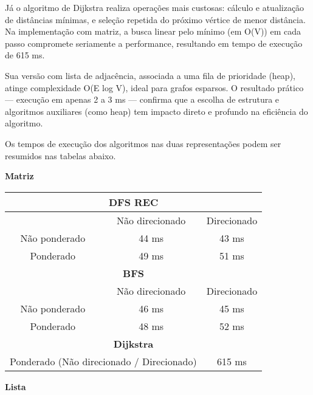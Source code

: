 \documentclass{sbc2023}%
\begin{document}
 Já o algoritmo de Dijkstra realiza operações mais custosas: cálculo e atualização de distâncias mínimas, e seleção repetida do próximo vértice de menor distância. Na implementação com matriz, a busca linear pelo mínimo (em O(V)) em cada passo compromete seriamente a performance, resultando em tempo de execução de 615 ms.

Sua versão com lista de adjacência, associada a uma fila de prioridade (heap), atinge complexidade O(E log V), ideal para grafos esparsos. O resultado prático — execução em apenas 2 a 3 ms — confirma que a escolha de estrutura e algoritmos auxiliares (como heap) tem impacto direto e profundo na eficiência do algoritmo.

Os tempos de execução dos algoritmos nas duas representações podem ser resumidos nas tabelas abaixo.

\begin{center}
\textbf{Matriz}
\end{center}

\begin{center}
\begin{tabular}{|c|c|c|}
\hline
\multicolumn{3}{|c|}{\textbf{DFS REC}} \\
\hline
 & Não direcionado & Direcionado \\
\hline
Não ponderado & 44 ms & 43 ms \\
Ponderado     & 49 ms & 51 ms \\
\hline
\multicolumn{3}{|c|}{\textbf{BFS}} \\
\hline
 & Não direcionado & Direcionado \\
\hline
Não ponderado & 46 ms & 45 ms \\
Ponderado     & 48 ms & 52 ms \\
\hline
\multicolumn{3}{|c|}{\textbf{Dijkstra}} \\
\hline
\multicolumn{2}{|c|}{Ponderado (Não direcionado / Direcionado)} & 615 ms \\
\hline
\end{tabular}
\end{center}

\vspace{1cm} %

\begin{center}
\textbf{Lista}
\end{center}
\end{document}
